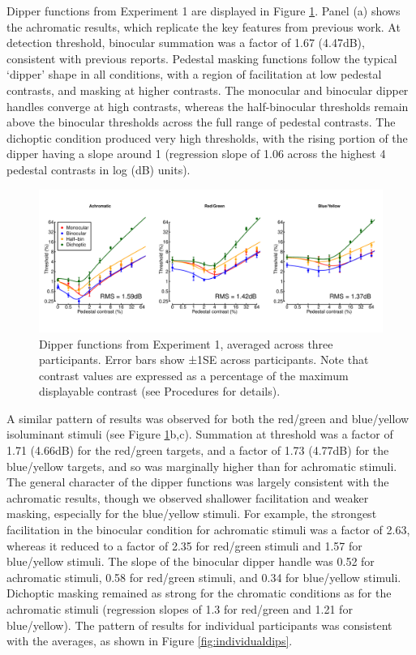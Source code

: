 \documentclass[
]{article}
\begin{document}
Dipper functions from Experiment 1 are displayed in Figure \ref{fig:dipperfig}. Panel (a) shows the achromatic results, which replicate the key features from previous work. At detection threshold, binocular summation was a factor of 1.67 (4.47dB), consistent with previous reports. Pedestal masking functions follow the typical `dipper' shape in all conditions, with a region of facilitation at low pedestal contrasts, and masking at higher contrasts. The monocular and binocular dipper handles converge at high contrasts, whereas the half-binocular thresholds remain above the binocular thresholds across the full range of pedestal contrasts. The dichoptic condition produced very high thresholds, with the rising portion of the dipper having a slope around 1 (regression slope of 1.06 across the highest 4 pedestal contrasts in log (dB) units).

\begin{figure}

{\centering \includegraphics{Figures/dipperssimplex} 

}

\caption{Dipper functions from Experiment 1, averaged across three participants. Error bars show ±1SE across participants. Note that contrast values are expressed as a percentage of the maximum displayable contrast (see Procedures for details).}\label{fig:dipperfig}
\end{figure}

A similar pattern of results was observed for both the red/green and blue/yellow isoluminant stimuli (see Figure \ref{fig:dipperfig}b,c). Summation at threshold was a factor of 1.71 (4.66dB) for the red/green targets, and a factor of 1.73 (4.77dB) for the blue/yellow targets, and so was marginally higher than for achromatic stimuli. The general character of the dipper functions was largely consistent with the achromatic results, though we observed shallower facilitation and weaker masking, especially for the blue/yellow stimuli. For example, the strongest facilitation in the binocular condition for achromatic stimuli was a factor of 2.63, whereas it reduced to a factor of 2.35 for red/green stimuli and 1.57 for blue/yellow stimuli. The slope of the binocular dipper handle was 0.52 for achromatic stimuli, 0.58 for red/green stimuli, and 0.34 for blue/yellow stimuli. Dichoptic masking remained as strong for the chromatic conditions as for the achromatic stimuli (regression slopes of 1.3 for red/green and 1.21 for blue/yellow). The pattern of results for individual participants was consistent with the averages, as shown in Figure \ref{fig:individualdips}.
\end{document}
